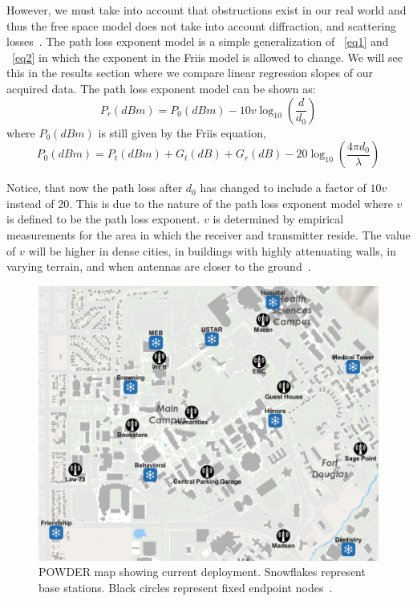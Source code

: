 However, we must take into account that obstructions exist in our real world and thus the free space model does not take into
account diffraction, and scattering losses~\cite{b5}. The path loss exponent model is a simple generalization of 
~\eqref{eq1} and ~\eqref{eq2} in which the exponent in the Friis model is allowed to change. We will see this in the results
section where we compare linear regression slopes of our acquired data. The path loss exponent model can be shown as:
\begin{equation}
P_r(dBm) = P_0(dBm) -10v\log_{10}(\frac{d}{d_0})\label{eq3}
\end{equation}
where $P_0 (dBm)$ is still given by the Friis equation,
\begin{equation}
P_0(dBm) = P_t(dBm) + G_t(dB) + G_r(dB) - 20\log_{10}(\frac{4\pi d_0}{\lambda})\label{eq4}
\end{equation}

Notice, that now the path loss after $d_0$ has changed to include a factor of $10v$ instead of 20. This is due to the nature of
the path loss exponent model where $v$ is defined to be the path loss exponent. $v$ is determined by empirical measurements
for the area in which the receiver and transmitter reside. The value of $v$ will be higher in dense cities, in buildings with highly
attenuating walls, in varying terrain, and when antennas are closer to the ground~\cite{b5}. 

\begin{figure}[htbp]
\centerline{\includegraphics[width=0.8\columnwidth]{figs/currPowder.png}}
\caption{POWDER map showing current deployment. Snowflakes represent base stations. Black circles represent fixed endpoint nodes~\cite{b1}.}
\label{powdernodes}
\vspace{-3mm}
\end{figure}

